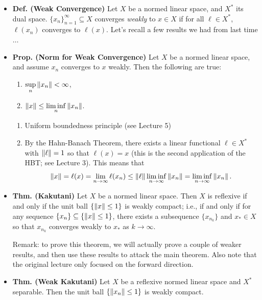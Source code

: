 \documentclass{article}
\begin{document}
\begin{itemize}
	\item \textbf{Def. (Weak Convergence)} Let $X$ be a normed linear space, and $X^{\ast}$ its dual space. $\{x_{n}\}_{n = 1}^{\infty} \subseteq X$ converges \textit{weakly} to $x \in X$ if for all $\ell \in X^{\ast}$, $\ell(x_{n})$ converges to $\ell(x)$. Let's recall a few results we had from last time $\ldots$
	\item \textbf{Prop. (Norm for Weak Convergence)} Let $X$ be a normed linear space, and assume $x_{n}$ converges to $x$ weakly. Then the following are true: 
	\begin{enumerate}[itemsep =-2pt,label = (\roman{*})]
		\item $\sup\limits_{n}\left\Vert x_{n} \right\Vert < \infty$, 
		\item $\left\Vert x \right\Vert \leq \liminf\limits_{n}\left\Vert x_{n} \right\Vert$. 
	\end{enumerate}
	
	\begin{solutions}
		\begin{enumerate}[itemsep =-2pt,label = (\roman{*})]
			\item Uniform boundedness principle (see Lecture 5)
			\item By the Hahn-Banach Theorem, there exists a linear functional $\ell \in X^{\ast}$ with $\left\Vert \ell \right\Vert = 1$ so that $\ell(x) = x$ (this is the second application of the HBT; see Lecture 3). This means that 
			\begin{equation}
				\left\Vert x \right\Vert = \ell(x) = \lim_{n \to \infty}\ell(x_{n}) \leq \left\Vert \ell \right\Vert\liminf_{n \to \infty}\left\Vert x_{n} \right\Vert = \liminf_{n \to \infty}\left\Vert x_{n} \right\Vert. 
			\end{equation} 
		\end{enumerate}
	\end{solutions}
	\item \textbf{Thm. (Kakutani)} Let $X$ be a normed linear space. Then $X$ is reflexive if and only if the unit ball $\{\left\Vert x \right\Vert \leq 1\}$ is weakly compact; i.e., if and only if for any sequence $\{x_{n}\} \subseteq \{\left\Vert x \right\Vert\leq 1\}$, there exists a subsequence $\{x_{n_{k}}\}$ and $x_{\ast} \in X$ so that $x_{n_{k}}$ converges weakly to $x_{\ast}$ as $k \to \infty$. 
	
	Remark: to prove this theorem, we will actually prove a couple of weaker results, and then use these results to attack the main theorem. Also note that the original lecture only focused on the forward direction. 
	
	\item \textbf{Thm. (Weak Kakutani)} Let $X$ be a reflexive normed linear space and $X^{\ast}$ separable. Then the unit ball $\{\left\Vert x_{n} \right\Vert \leq 1\}$ is weakly compact. 
	

\end{itemize}
\end{document}
